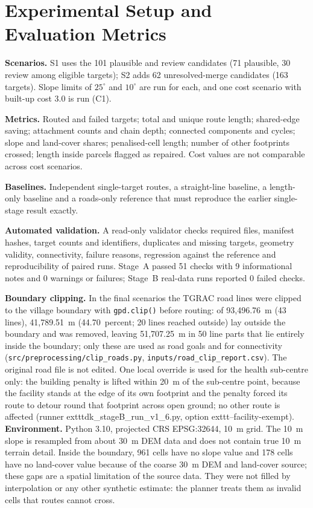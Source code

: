 \documentclass[12pt,a4paper]{report}
\begin{document}
\chapter{Experimental Setup and Evaluation Metrics}
\textbf{Scenarios.} S1 uses the 101 plausible and review candidates (71 plausible, 30 review among eligible targets); S2 adds 62 unresolved-merge candidates (163 targets). Slope limits of $25^{\circ}$ and $10^{\circ}$ are run for each, and one cost scenario with built-up cost 3.0 is run (C1).

\textbf{Metrics.} Routed and failed targets; total and unique route length; shared-edge saving; attachment counts and chain depth; connected components and cycles; slope and land-cover shares; penalised-cell length; number of other footprints crossed; length inside parcels flagged as repaired. Cost values are not comparable across cost scenarios.

\textbf{Baselines.} Independent single-target routes, a straight-line baseline, a length-only baseline and a roads-only reference that must reproduce the earlier single-stage result exactly.

\textbf{Automated validation.} A read-only validator checks required files, manifest hashes, target counts and identifiers, duplicates and missing targets, geometry validity, connectivity, failure reasons, regression against the reference and reproducibility of paired runs. Stage~A passed 51 checks with 9 informational notes and 0 warnings or failures; Stage~B real-data runs reported 0 failed checks.

\textbf{Boundary clipping.} In the final scenarios the TGRAC road lines were clipped to the village boundary with \texttt{gpd.clip()} before routing: of 93,496.76~m (43 lines), 41,789.51~m (44.70~percent; 20 lines reached outside) lay outside the boundary and was removed, leaving 51,707.25~m in 50 line parts that lie entirely inside the boundary; only these are used as road goals and for connectivity (\texttt{src/preprocessing/clip\_roads.py}, \texttt{inputs/road\_clip\_report.csv}). The original road file is not edited. One local override is used for the health sub-centre only: the building penalty is lifted within 20~m of the sub-centre point, because the facility stands at the edge of its own footprint and the penalty forced its route to detour round that footprint across open ground; no other route is affected (runner 	exttt{dk\_stageB\_run\_v1\_6.py}, option 	exttt{--facility-exempt}). \textbf{Environment.} Python 3.10, projected CRS EPSG:32644, 10~m grid. The 10~m slope is resampled from about 30~m DEM data and does not contain true 10~m terrain detail. Inside the boundary, 961 cells have no slope value and 178 cells have no land-cover value because of the coarse 30~m DEM and land-cover source; these gaps are a spatial limitation of the source data. They were not filled by interpolation or any other synthetic estimate: the planner treats them as invalid cells that routes cannot cross.
\end{document}
